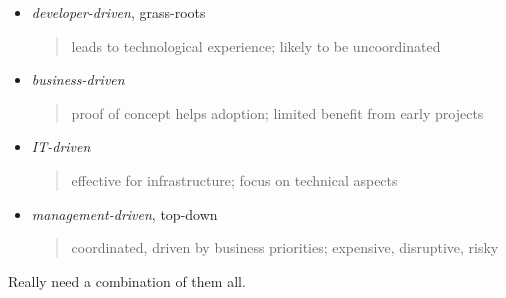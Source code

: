 \documentclass{sepslide-soa-faked} %
\begin{document}
\begin{slide}
\begin{itemize}
\item \emph{developer-driven}, grass-roots
\begin{quote}
leads to technological experience; 
likely to be uncoordinated
\end{quote}
\item \emph{business-driven}
\begin{quote}
proof of concept helps adoption;
limited benefit from early projects
\end{quote}
\item \emph{IT-driven}
\begin{quote}
effective for infrastructure;
focus on technical aspects
\end{quote}
\item \emph{management-driven}, top-down
\begin{quote}
coordinated, driven by business priorities;
expensive, disruptive, risky
\end{quote}
\end{itemize}
Really need a combination of them all.
\end{slide}

\begin{slide}
  \Listofslides
\end{slide}

\begin{slide}
  \Timetable
\end{slide}
\end{document}
